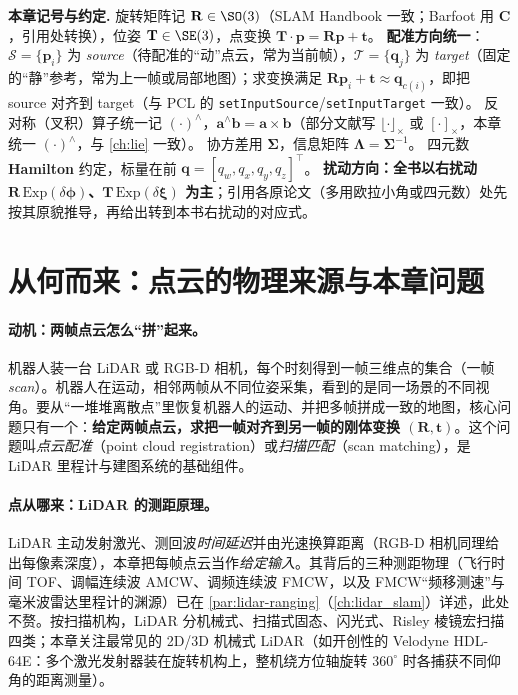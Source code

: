 \begin{note}
\textbf{本章记号与约定.}\;
旋转矩阵记 $\mathbf{R}\in\SO(3)$（SLAM Handbook\cite{carlone2026handbook} 一致；Barfoot\cite{barfoot2024state} 用 $\mathbf{C}$，引用处转换），位姿 $\mathbf{T}\in\SE(3)$，点变换 $\mathbf{T}\!\cdot\!\mathbf{p}=\mathbf{R}\mathbf{p}+\mathbf{t}$。
\textbf{配准方向统一}：$\mathcal{S}=\{\mathbf{p}_i\}$ 为 \emph{source}（待配准的“动”点云，常为当前帧），$\mathcal{T}=\{\mathbf{q}_j\}$ 为 \emph{target}（固定的“静”参考，常为上一帧或局部地图）；求变换满足 $\mathbf{R}\mathbf{p}_i+\mathbf{t}\approx\mathbf{q}_{c(i)}$，即把 source 对齐到 target（与 PCL 的 \texttt{setInputSource}/\allowbreak\texttt{setInputTarget} 一致）。
反对称（叉积）算子统一记 $(\cdot)^\wedge$，$\mathbf{a}^\wedge\mathbf{b}=\mathbf{a}\times\mathbf{b}$（部分文献写 $\lfloor\cdot\rfloor_\times$ 或 $[\cdot]_\times$，本章统一 $(\cdot)^\wedge$，与 \cref{ch:lie} 一致）。
协方差用 $\boldsymbol{\Sigma}$，信息矩阵 $\boldsymbol{\Lambda}=\boldsymbol{\Sigma}^{-1}$。
四元数 \textbf{Hamilton} 约定，标量在前 $\mathbf{q}=[q_w,q_x,q_y,q_z]^\top$。
\textbf{扰动方向：全书以右扰动 $\mathbf{R}\,\mathrm{Exp}(\delta\boldsymbol{\phi})$、$\mathbf{T}\,\mathrm{Exp}(\delta\boldsymbol{\xi})$ 为主}；引用各原论文（多用欧拉小角或四元数）处先按其原貌推导，再给出转到本书右扰动的对应式。
\end{note}

\section{从何而来：点云的物理来源与本章问题}
\label{sec:pc-why}

\paragraph{动机：两帧点云怎么“拼”起来。}
机器人装一台 LiDAR 或 RGB-D 相机，每个时刻得到一帧三维点的集合（一帧 \emph{scan}）。机器人在运动，相邻两帧从不同位姿采集，看到的是同一场景的不同视角。要从“一堆堆离散点”里恢复机器人的运动、并把多帧拼成一致的地图，核心问题只有一个：\textbf{给定两帧点云，求把一帧对齐到另一帧的刚体变换 $(\mathbf{R},\mathbf{t})$}。这个问题叫\emph{点云配准}（point cloud registration）或\emph{扫描匹配}（scan matching），是 LiDAR 里程计与建图系统的基础组件\cite{carlone2026handbook}。

\paragraph{点从哪来：LiDAR 的测距原理。}
LiDAR 主动发射激光、测回波\emph{时间延迟}并由光速换算距离（RGB-D 相机同理给出每像素深度），本章把每帧点云当作\emph{给定输入}。其背后的三种测距物理（飞行时间 TOF、调幅连续波 AMCW、调频连续波 FMCW，以及 FMCW“频移测速”与毫米波雷达里程计的渊源）已在 \cref{par:lidar-ranging}（\cref{ch:lidar_slam}）详述，此处不赘。按扫描机构，LiDAR 分机械式、扫描式固态、闪光式、Risley 棱镜宏扫描四类；本章关注最常见的 2D/3D 机械式 LiDAR（如开创性的 Velodyne HDL-64E：多个激光发射器装在旋转机构上，整机绕方位轴旋转 $360^\circ$ 时各捕获不同仰角的距离测量）。

